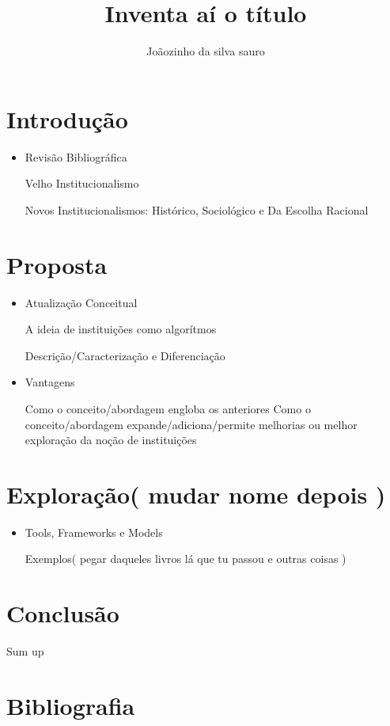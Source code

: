 \documentclass{article}
\title{ Inventa aí o título }
\author{ Joãozinho da silva sauro }
\date{}
\begin{document}
\maketitle

\newpage

\section{ Introdução }

\begin{itemize}

\item Revisão Bibliográfica

    \subitem Velho Institucionalismo
    
    \subitem Novos Institucionalismos: Histórico, Sociológico e Da Escolha Racional

\end{itemize}

\section{ Proposta }

\begin{itemize}

\item Atualização Conceitual

    \subitem A ideia de instituições como algorítmos
    
        \subsubitem Descrição/Caracterização e Diferenciação
        
\item Vantagens

    \subitem Como o conceito/abordagem engloba os anteriores
    \subitem Como o conceito/abordagem expande/adiciona/permite melhorias ou melhor exploração da noção de instituições

\end{itemize}

\section{ Exploração( mudar nome depois ) }

\begin{itemize}

\item Tools, Frameworks e Models

    \subitem Exemplos( pegar daqueles livros lá que tu passou e outras coisas )

\end{itemize}

\section{ Conclusão }

Sum up

\newpage

\section*{ Bibliografia }
\end{document}
